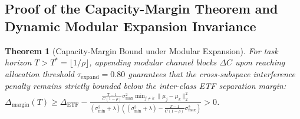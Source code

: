 \documentclass{article}
\newtheorem{theorem}{Theorem}[section]
\begin{document}
\subsection{Proof of the Capacity-Margin Theorem and Dynamic Modular Expansion Invariance}
\label{sec:proof_capacity_margin}
\label{sec:proof_dynamic_expansion}

\begin{theorem}[Capacity-Margin Bound under Modular Expansion]
\label{thm:capacity_margin}
For task horizon $T > T^* = \lfloor 1/\rho \rfloor$, appending modular channel blocks $\Delta C$ upon reaching allocation threshold $\tau_{\mathrm{expand}} = 0.80$ guarantees that the cross-subspace interference penalty remains strictly bounded below the inter-class ETF separation margin: $\Delta_{\mathrm{margin}}(T) \ge \Delta_{\mathrm{ETF}} - \frac{\frac{T-1}{C(1-\rho)}\sigma_{\max}^2 \min_{j \ne k} \|\mu_j - \mu_k\|_2^2}{(\sigma_{\min}^2 + \lambda)\left((\sigma_{\min}^2 + \lambda) - \frac{T-1}{C(1-\rho)}\sigma_{\max}^2\right)} > 0$.
\end{theorem}
\end{document}
